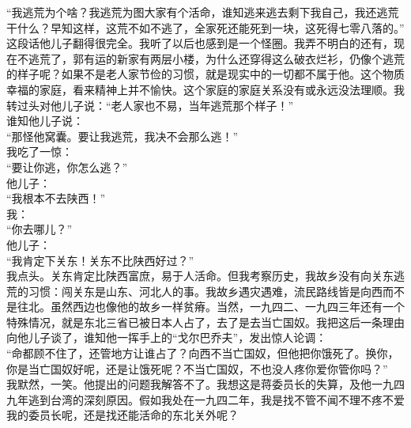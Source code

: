 “我逃荒为个啥？我逃荒为图大家有个活命，谁知逃来逃去剩下我自己，我还逃荒干什么？早知这样，这荒不如不逃了，全家死还能死到一块，这死得七零八落的。”\\

这段话他儿子翻得很完全。我听了以后也感到是一个怪圈。我弄不明白的还有，现在不逃荒了，郭有运的新家有两层小楼，为什么还穿得这么破衣烂衫，仍像个逃荒的样子呢？如果不是老人家节俭的习惯，就是现实中的一切都不属于他。这个物质幸福的家庭，看来精神上并不愉快。这个家庭的家庭关系没有或永远没法理顺。我转过头对他儿子说：“老人家也不易，当年逃荒那个样子！”\\

谁知他儿子说：\\

“那怪他窝囊。要让我逃荒，我决不会那么逃！”\\

我吃了一惊：\\

“要让你逃，你怎么逃？”\\

他儿子：\\

“我根本不去陕西！”\\

我：\\

“你去哪儿？”\\

他儿子：\\

“我肯定下关东！关东不比陕西好过？”\\

我点头。关东肯定比陕西富庶，易于人活命。但我考察历史，我故乡没有向关东逃荒的习惯：闯关东是山东、河北人的事。我故乡遇灾遇难，流民路线皆是向西而不是往北。虽然西边也像他的故乡一样贫瘠。当然，一九四二、一九四三年还有一个特殊情况，就是东北三省已被日本人占了，去了是去当亡国奴。我把这后一条理由向他儿子谈了，谁知他一挥手上的“戈尔巴乔夫”，发出惊人论调：\\

“命都顾不住了，还管地方让谁占了？向西不当亡国奴，但他把你饿死了。换你，你是当亡国奴好呢，还是让饿死呢？不当亡国奴，不也没人疼你爱你管你吗？”\\

我默然，一笑。他提出的问题我解答不了。我想这是蒋委员长的失算，及他一九四九年逃到台湾的深刻原因。假如我处在一九四二年，我是找不管不闻不理不疼不爱我的委员长呢，还是找还能活命的东北关外呢？\\

